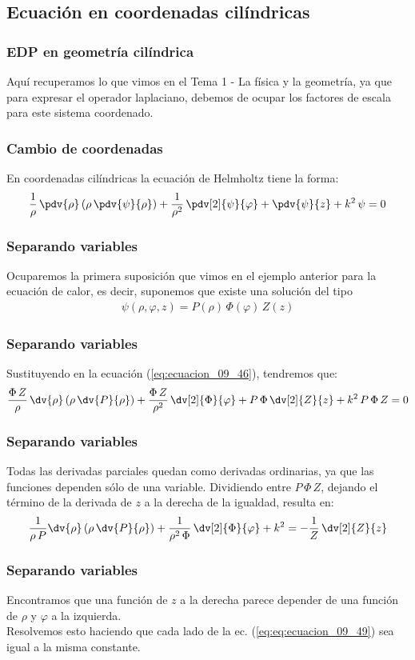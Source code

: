 \subsection{Ecuación en coordenadas cilíndricas}
\begin{frame}
\frametitle{EDP en geometría cilíndrica}
Aquí recuperamos lo que vimos en el Tema 1 - La física y la geometría, ya que para expresar el operador laplaciano, debemos de ocupar los factores de escala para este sistema coordenado.
\end{frame}
\begin{frame}
\frametitle{Cambio de coordenadas}
En coordenadas cilíndricas la ecuación de Helmholtz tiene la forma:
\begin{align}
\dfrac{1}{\rho} \, \pdv{\rho} \left( \rho \, \pdv{\psi}{\rho} \right) + \dfrac{1}{\rho^{2}} \, \pdv[2]{\psi}{\varphi} + \pdv{\psi}{z} + k^{2} \, \psi = 0
\label{eq:ecuacion_09_46}
\end{align}
\end{frame}
\begin{frame}
\frametitle{Separando variables}
Ocuparemos la primera suposición que vimos en el ejemplo anterior para la ecuación de calor, es decir, suponemos que existe una solución del tipo
\begin{align}
\psi (\rho, \varphi, z) = P(\rho) \, \Phi (\varphi) \, Z(z)
\label{eq:ecuacion_09_47}
\end{align}
\end{frame}
\begin{frame}
\frametitle{Separando variables}
Sustituyendo en la ecuación (\ref{eq:ecuacion_09_46}), tendremos que:
\begin{align}
\dfrac{\Phi \, Z}{\rho} \, \dv{\rho} \left( \rho \, \dv{P}{\rho} \right) + \dfrac{\Phi \, Z}{\rho^{2}} \, \dv[2]{\Phi}{\varphi} + P \, \Phi \, \dv[2]{Z}{z} + k^{2} \, P \, \Phi \, Z = 0 
\label{eq:ecuacion_09_48}    
\end{align}
\end{frame}
\begin{frame}
\frametitle{Separando variables}
Todas las derivadas parciales quedan como derivadas ordinarias, ya que las funciones dependen sólo de una variable. Dividiendo entre $P \, \Phi \, Z$, dejando el término de la derivada de $z$ a la derecha de la igualdad, resulta en:
\begin{align}
\dfrac{1}{\rho \, P} \dv{\rho} \left( \rho \, \dv{P}{\rho} \right) + \dfrac{1}{\rho^{2} \, \Phi} \, \dv[2]{\Phi}{\varphi} + k^{2} =  - \dfrac{1}{Z} \, \dv[2]{Z}{z}
\label{eq:eq:ecuacion_09_49}
\end{align}
\end{frame}
\begin{frame}
\frametitle{Separando variables}
Encontramos que una función de $z$ a la derecha parece depender de una función de $\rho$ y $\varphi$ a la izquierda.
\\
\bigskip
Resolvemos esto haciendo que cada lado de la ec. (\ref{eq:eq:ecuacion_09_49}) sea igual a la misma constante. 
\end{frame}
